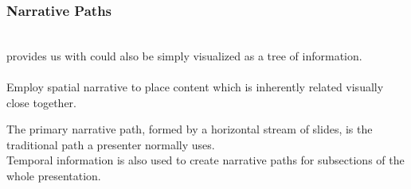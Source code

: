 \begin{frame}
  \frametitle{Narrative Paths}
  \begin{module}[id=narrativePaths]\\
\noindent
{} provides us with could also be simply visualized as a tree of information.\\ 
\\
\noindent
Employ spatial narrative to place content which is inherently related visually close together.\\


\noindent
The primary narrative path, formed by a horizontal stream of slides, is the traditional path a presenter normally uses.\\ 

\noindent
Temporal information is also used to create narrative paths for subsections of the whole presentation.

  \end{module}
\end{frame}
